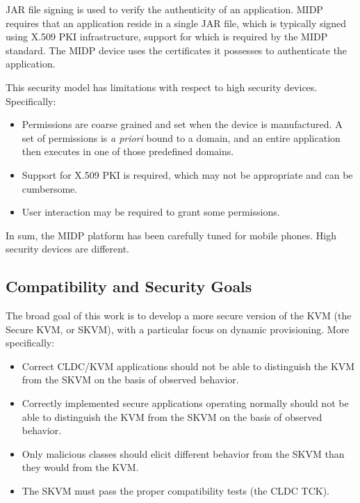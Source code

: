 \documentclass{llncs}
\begin{document}
JAR file signing is used to verify the authenticity of an application.
MIDP requires that an application reside in a single JAR file, which
is typically signed using X.509 PKI infrastructure, support for
which is required by the MIDP standard. The MIDP device uses the
certificates it possesses to authenticate the application.

This security model has limitations with respect to high security
devices. Specifically:
\begin{itemize}
  \item Permissions are coarse grained and set when the	device is manufactured.
  A set of permissions is \emph{a priori} bound to a domain, and an entire application
  then executes in one of those predefined domains.
  \item Support for X.509 PKI is required, which may not be appropriate and can
  be cumbersome.
  \item User interaction may be required to grant some permissions.
\end{itemize}

In sum, the MIDP platform has been carefully tuned for mobile phones.
High security devices are different.

\subsection{Compatibility and Security Goals}

The broad goal of this work is to develop a more secure version of
the KVM (the Secure KVM, or SKVM), with a particular focus on dynamic
provisioning. More specifically:
\begin{itemize}
  \item Correct CLDC/KVM applications should not be able to distinguish
  the KVM from the SKVM on the basis of observed behavior.
  \item Correctly implemented secure applications operating
  normally should not be able to distinguish the KVM from the
  SKVM on the basis of observed behavior.
  \item Only malicious classes should elicit different behavior from the
  SKVM than they would from the KVM.
  \item The SKVM must pass the proper compatibility tests (the CLDC TCK).
\end{itemize}
\end{document}
